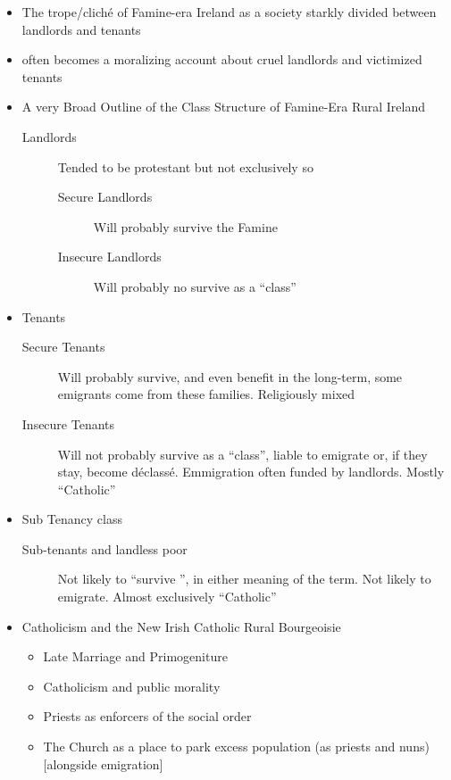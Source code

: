 \documentclass[12pt]{article}
\begin{document}
\begin{itemize}
\begin{itemize}
\begin{itemize}
                    \end{itemize}
                \end{itemize}
                \item The trope/cliché of Famine-era Ireland as a society starkly divided between landlords and tenants
                \item often becomes a moralizing account about cruel landlords and victimized tenants
                \item A very Broad Outline of the Class Structure of Famine-Era Rural Ireland
                \begin{description} 
                    \item[Landlords] Tended to be protestant but not exclusively so
                    \begin{description}
                        \item[Secure Landlords] Will probably survive the Famine
                        \item[Insecure Landlords] Will probably no survive as a ``class''
                    \end{description}
                \end{description}
                \item Tenants
                \begin{description}
                    \item[Secure Tenants] Will probably survive, and even benefit in the long-term, some emigrants come from these families. Religiously mixed
                    \item[Insecure Tenants] Will not probably survive as a ``class'', liable to emigrate or, if they stay, become déclassé. Emmigration often funded by landlords. Mostly ``Catholic'' 
                \end{description}
                \item Sub Tenancy class
                \begin{description}
                    \item[Sub-tenants and landless poor] Not likely to ``survive '', in either meaning of the term. Not likely to emigrate. Almost exclusively ``Catholic''
                \end{description}
                \item Catholicism and the New Irish Catholic Rural Bourgeoisie
                \begin{itemize}
                    \item Late Marriage and Primogeniture
                    \item Catholicism and public morality
                    \item Priests as enforcers of the social order
                    \item The Church as a place to park excess population (as priests and nuns) [alongside emigration]
                \end{itemize}
            \end{itemize}
            \newpage
\end{document}
